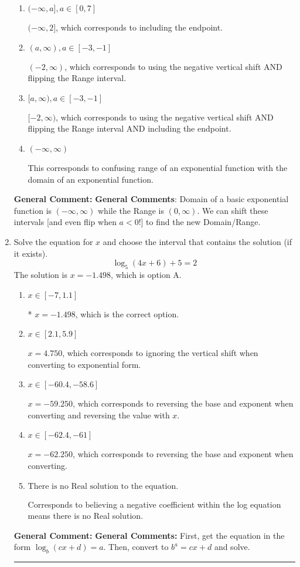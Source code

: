 \documentclass{extbook}[14pt]
\newcommand{\litem}[1]{\item #1

\rule{\textwidth}{0.4pt}}
\begin{document}
\begin{enumerate}
{\begin{enumerate}[label=\Alph*.]
* $(-\infty, 2)$, which is the correct option.
\item \( (-\infty, a], a \in [0, 7] \)

$(-\infty, 2]$, which corresponds to including the endpoint.
\item \( (a, \infty), a \in [-3, -1] \)

$(-2, \infty)$, which corresponds to using the negative vertical shift AND flipping the Range interval.
\item \( [a, \infty), a \in [-3, -1] \)

$[-2, \infty)$, which corresponds to using the negative vertical shift AND flipping the Range interval AND including the endpoint.
\item \( (-\infty, \infty) \)

This corresponds to confusing range of an exponential function with the domain of an exponential function.
\end{enumerate}

\textbf{General Comment:} \textbf{General Comments}: Domain of a basic exponential function is $(-\infty, \infty)$ while the Range is $(0, \infty)$. We can shift these intervals [and even flip when $a<0$!] to find the new Domain/Range.
}
\litem{
Solve the equation for $x$ and choose the interval that contains the solution (if it exists).
\[ \log_{5}{(4x+6)}+5 = 2 \]The solution is \( x = -1.498 \), which is option A.\begin{enumerate}[label=\Alph*.]
\item \( x \in [-7, 1.1] \)

* $x = -1.498$, which is the correct option.
\item \( x \in [2.1, 5.9] \)

$x = 4.750$, which corresponds to ignoring the vertical shift when converting to exponential form.
\item \( x \in [-60.4, -58.6] \)

$x = -59.250$, which corresponds to reversing the base and exponent when converting and reversing the value with $x$.
\item \( x \in [-62.4, -61] \)

$x = -62.250$, which corresponds to reversing the base and exponent when converting.
\item \( \text{There is no Real solution to the equation.} \)

Corresponds to believing a negative coefficient within the log equation means there is no Real solution.
\end{enumerate}

\textbf{General Comment:} \textbf{General Comments:} First, get the equation in the form $\log_b{(cx+d)} = a$. Then, convert to $b^a = cx+d$ and solve.
}
\end{enumerate}
\end{document}

